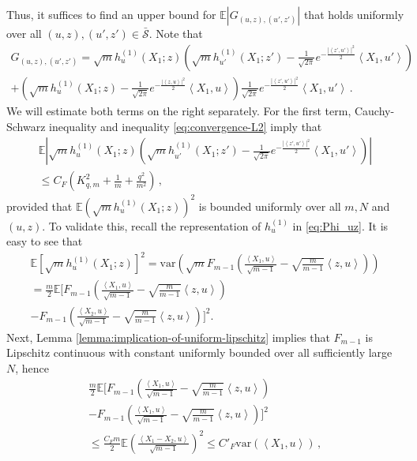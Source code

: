 \documentclass[12pt]{article}
\newcommand\var{\mathrm{var}}
\def\l{\left}
\def\r{\right}
\newcommand{\mb}{\mathbb}
\newcommand{\dotp}[2]{\left\langle#1,#2\right\rangle}
\theoremstyle{thmstyletwo}%
\theoremstyle{thmstylethree}%
\begin{document}
Thus, it suffices to find an upper bound for $\mb E \l\lvert G_{(u,z), (u',z')} \r\rvert$ that holds uniformly over all $(u,z), (u',z') \in \bar{\mathcal{S}}$. Note that
    \begin{multline}\label{eq:G_term}
        G_{(u,z), (u',z')} = \sqrt{m}h^{(1)}_{u}(X_1;z) \left( \sqrt{m} h^{(1)}_{u'}(X_1;z') - \frac{1}{\sqrt{2\pi}}e^{-\frac{\l\lvert \dotp{z'}{u'}\r\rvert^2}{2}}\dotp{X_1}{u'} \right) \\
        + \left( \sqrt{m} h^{(1)}_{u}(X_1;z) - \frac{1}{\sqrt{2\pi}}e^{-\frac{\l\lvert \dotp{z}{u}\r\rvert^2}{2}}\dotp{X_1}{u} \right) \frac{1}{\sqrt{2\pi}}e^{-\frac{\l\lvert \dotp{z'}{u'}\r\rvert^2}{2}}\dotp{X_1}{u'}\,.
    \end{multline}
    We will estimate both terms on the right separately. For the first term, Cauchy-Schwarz inequality and inequality \eqref{eq:convergence-L2} imply that
    \begin{multline*}
        \mb E\l\lvert \sqrt{m}h^{(1)}_{u}(X_1;z) \left( \sqrt{m} h^{(1)}_{u'}(X_1;z') - \frac{1}{\sqrt{2\pi}}e^{-\frac{\l\lvert \dotp{z'}{u'}\r\rvert^2}{2}}\dotp{X_1}{u'} \right)\r\rvert \\
        \leq  C_F\l(K_{q,m}^2 + \frac{1}{m} + \frac{q^2}{m^2}\r)\,,
    \end{multline*}
    provided that $\mb E\l(\sqrt{m}h^{(1)}_{u}(X_1;z)\r)^2$ is bounded uniformly over all $m,N$ and $(u,z)$. To validate this, recall the representation of $h^{(1)}_{u}$ in \eqref{eq:Phi_uz}. It is easy to see that
\begin{multline*}
    \mb E\l[\sqrt{m}h^{(1)}_{u}\l(X_1;z\r)\r]^2 = \var\l(\sqrt{m} F_{m-1}\left(\frac{\dotp{X_1}{u}}{\sqrt{m-1}} - \sqrt{\frac{m}{m-1}}\dotp{z}{u}\right)\r) \\
    = \frac{m}{2} \mb E\Biggl[F_{m-1}\left(\frac{\dotp{X_1}{u}}{\sqrt{m-1}} - \sqrt{\frac{m}{m-1}}\dotp{z}{u}\right) \\
    - F_{m-1}\left(\frac{\dotp{X_2}{u}}{\sqrt{m-1}} - \sqrt{\frac{m}{m-1}}\dotp{z}{u}\right)\Biggr]^2.
\end{multline*}
Next, Lemma \ref{lemma:implication-of-uniform-lipschitz} implies that $F_{m-1}$ is Lipschitz continuous with constant uniformly bounded over all sufficiently large $N$, hence
\begin{multline*}
    \frac{m}{2} \mb E\Biggl[F_{m-1}\left(\frac{\dotp{X_1}{u}}{\sqrt{m-1}} - \sqrt{\frac{m}{m-1}}\dotp{z}{u}\right) \\
    - F_{m-1}\left(\frac{\dotp{X_1}{u}}{\sqrt{m-1}} - \sqrt{\frac{m}{m-1}}\dotp{z}{u}\right)\Biggr]^2 \\
    \leq \frac{C_{F}m}{2} \mb E\l(\frac{\dotp{X_1 - X_2}{u}}{\sqrt{m-1}}\r)^2 \leq C'_F\var\l(\dotp{X_1}{u}\r)\,,
\end{multline*}
\end{document}
